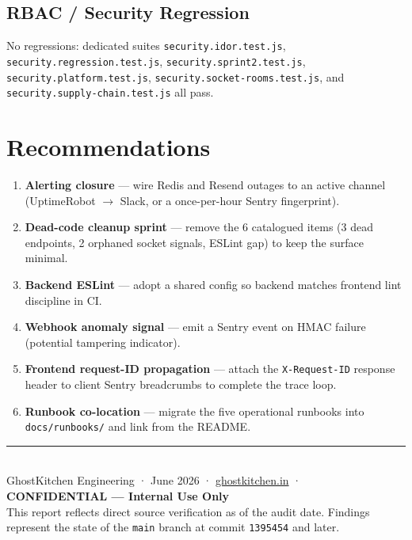 \documentclass[11pt,a4paper]{article}
\begin{document}
\subsection{RBAC / Security Regression}
No regressions: dedicated suites \texttt{security.idor.test.js},
\texttt{security.regression.test.js}, \texttt{security.sprint2.test.js},
\texttt{security.platform.test.js}, \texttt{security.socket-rooms.test.js}, and
\texttt{security.supply-chain.test.js} all pass.

\section{Recommendations}

\begin{enumerate}[leftmargin=1.5em]
  \item \textbf{Alerting closure} — wire Redis and Resend outages to an active channel (UptimeRobot $\to$ Slack, or a once-per-hour Sentry fingerprint).
  \item \textbf{Dead-code cleanup sprint} — remove the 6 catalogued items (3 dead endpoints, 2 orphaned socket signals, ESLint gap) to keep the surface minimal.
  \item \textbf{Backend ESLint} — adopt a shared config so backend matches frontend lint discipline in CI.
  \item \textbf{Webhook anomaly signal} — emit a Sentry event on HMAC failure (potential tampering indicator).
  \item \textbf{Frontend request-ID propagation} — attach the \texttt{X-Request-ID} response header to client Sentry breadcrumbs to complete the trace loop.
  \item \textbf{Runbook co-location} — migrate the five operational runbooks into \texttt{docs/runbooks/} and link from the README.
\end{enumerate}

\vfill
\begin{center}
{\color{brand}\rule{0.5\linewidth}{2pt}}\\[0.4em]
{\small\color{muted}GhostKitchen Engineering · June 2026 ·
\href{https://ghostkitchen.in}{ghostkitchen.in} · \textbf{CONFIDENTIAL — Internal Use Only}}\\[2pt]
{\footnotesize\color{muted}This report reflects direct source verification as of the audit date.
Findings represent the state of the \texttt{main} branch at commit \texttt{1395454} and later.}
\end{center}
\end{document}
